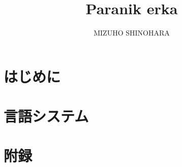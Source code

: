 \documentclass[a4paper, 12pt, titlepage]{ltjsreport}
\title{Paranik erka}
\author{MIZUHO SHINOHARA}
\begin{document}
\maketitle

\tableofcontents

\part{はじめに}



\part{言語システム}








\part{附録}

\appendix

% 
% 
\end{document}
